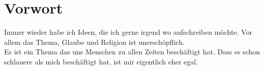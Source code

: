 \section{Vorwort}

Immer wieder habe ich Ideen, die ich gerne irgend wo aufschreiben möchte. Vor allem das Thema, Glaube und Religion ist unerschöpflich.\\
Es ist ein Thema das uns Menschen zu allen Zeiten beschäftigt hat. Dass es schon schlauere als mich beschäftigt hat, ist mir eigentlich eher egal.







